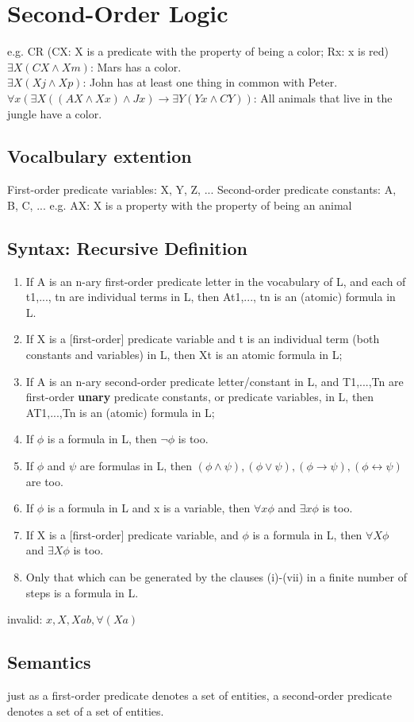 \section{Second-Order Logic}
e.g. CR (CX: X is a predicate with the property of being a color; Rx: x is red) \\
$\exists X(CX \land Xm)$: Mars has a color. \\
$\exists X(Xj \land Xp)$: John has at least one thing in common with Peter. \\
$\forall x (\exists X ((AX \land Xx) \land Jx) \to \exists Y (Yx \land CY))$: All animals that live in the jungle have a color.

\subsection*{Vocalbulary extention}
First-order predicate variables: X, Y, Z, ...
Second-order predicate constants: A, B, C, ...
e.g. AX: X is a property with the property of being an animal

\subsection*{Syntax: Recursive Definition}
\begin{enumerate}
\item If A is an n-ary first-order predicate letter in the vocabulary of L, and each of t1,..., tn are individual terms in L, then At1,..., tn is an (atomic) formula in L.
\item If X is a [first-order] predicate variable and t is an individual term (both constants and variables) in L, then Xt is an atomic formula in L;
\item If A is an n-ary second-order predicate letter/constant in L, and
T1,...,Tn are first-order \textbf{unary} predicate constants, or predicate
variables, in L, then AT1,...,Tn is an (atomic) formula in L;
\item If $\phi$ is a formula in L, then $\neg \phi$ is too.
\item If $\phi$ and $\psi$ are formulas in L, then $(\phi \land \psi), (\phi \lor \psi), (\phi \to \psi), (\phi \leftrightarrow \psi)$ are too.
\item If $\phi$ is a formula in L and x is a variable, then $\forall x \phi$ and $\exists x \phi$ is too.
\item If X is a [first-order] predicate variable, and $\phi$ is a formula in L, then $\forall X \phi$ and $\exists X \phi$ is too.
\item Only that which can be generated by the clauses (i)-(vii) in a finite number of steps is a formula in L.
\end{enumerate}
invalid: $x, X, Xab, \forall(Xa)$ \\

\subsection*{Semantics}
just as a first-order predicate denotes a set of entities, a second-order predicate denotes a set of a
set of entities.